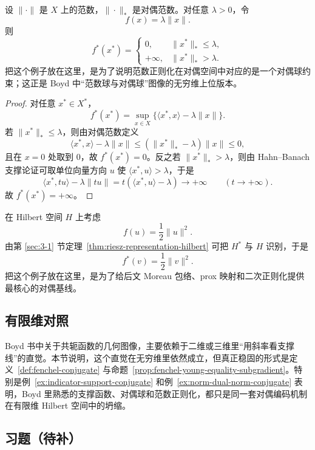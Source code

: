 \begin{example}[范数与对偶范数的共轭]\label{ex:norm-dual-norm-conjugate}
设 $\|\cdot\|$ 是 $X$ 上的范数，$\|\cdot\|_\ast$ 是对偶范数。对任意 $\lambda>0$，令
\[
f(x)=\lambda \|x\|.
\]
则
\[
f^\ast(x^\ast)=
\begin{cases}
0, & \|x^\ast\|_\ast\le \lambda,\\
+\infty, & \|x^\ast\|_\ast>\lambda.
\end{cases}
\]
把这个例子放在这里，是为了说明范数正则化在对偶空间中对应的是一个对偶球约束；这正是 Boyd 中“范数球与对偶球”图像的无穷维上位版本。
\end{example}

\begin{proof}
对任意 $x^\ast\in X^\ast$，
\[
f^\ast(x^\ast)=\sup_{x\in X}\{\langle x^\ast,x\rangle-\lambda\|x\|\}.
\]
若 $\|x^\ast\|_\ast\le \lambda$，则由对偶范数定义
\[
\langle x^\ast,x\rangle-\lambda\|x\|
\le (\|x^\ast\|_\ast-\lambda)\|x\|\le 0,
\]
且在 $x=0$ 处取到 $0$，故 $f^\ast(x^\ast)=0$。反之若 $\|x^\ast\|_\ast>\lambda$，则由 Hahn--Banach 支撑论证可取单位向量方向 $u$ 使 $\langle x^\ast,u\rangle>\lambda$，于是
\[
\langle x^\ast,tu\rangle-\lambda\|tu\|
=t(\langle x^\ast,u\rangle-\lambda)\to +\infty
\qquad (t\to+\infty).
\]
故 $f^\ast(x^\ast)=+\infty$。
\end{proof}

\begin{example}[正则化项的对偶表示]
在 Hilbert 空间 $H$ 上考虑
\[
f(u)=\frac{1}{2}\|u\|^2.
\]
由第 \ref{sec:3-1} 节定理~\ref{thm:riesz-representation-hilbert} 可把 $H^\ast$ 与 $H$ 识别，于是
\[
f^\ast(v)=\frac{1}{2}\|v\|^2.
\]
把这个例子放在这里，是为了给后文 Moreau 包络、prox 映射和二次正则化提供最核心的对偶基线。
\end{example}

\subsection*{有限维对照}

Boyd 书中关于共轭函数的几何图像，主要依赖于二维或三维里“用斜率看支撑线”的直觉。本节说明，这个直觉在无穷维里依然成立，但真正稳固的形式是定义~\ref{def:fenchel-conjugate} 与命题~\ref{prop:fenchel-young-equality-subgradient}。特别是例~\ref{ex:indicator-support-conjugate} 和例~\ref{ex:norm-dual-norm-conjugate} 表明，Boyd 里熟悉的支撑函数、对偶球和范数正则化，都只是同一套对偶编码机制在有限维 Hilbert 空间中的坍缩。

\subsection*{习题（待补）}

